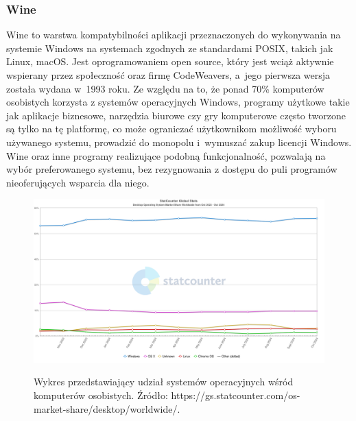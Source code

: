 \subsubsection{Wine\cite{wine}}
Wine to warstwa kompatybilności aplikacji przeznaczonych do wykonywania na systemie Windows na systemach zgodnych ze standardami POSIX, takich jak Linux, macOS. Jest oprogramowaniem open source, który jest wciąż aktywnie wspierany przez społeczność oraz firmę CodeWeavers, a~jego pierwsza wersja została wydana w~1993 roku. Ze względu na to, że ponad 70\% komputerów osobistych korzysta z systemów operacyjnych Windows\cite{windowsMarketShare}, programy użytkowe takie jak aplikacje biznesowe, narzędzia biurowe czy gry komputerowe często tworzone są tylko na tę platformę, co może ograniczać użytkownikom możliwość wyboru używanego systemu, prowadzić do monopolu i~wymuszać zakup licencji Windows. Wine oraz inne programy realizujące podobną funkcjonalność, pozwalają na wybór preferowanego systemu, bez rezygnowania z dostępu do puli programów nieoferujących wsparcia dla niego.

\begin{figure}[!h]
	\begin{center}
		\resizebox{1\textwidth}{!} {
			\includegraphics{img/3/desktop-os-market-share.png}
		}
		\caption{Wykres przedstawiający udział systemów operacyjnych wśród komputerów osobistych. Źródło: https://gs.statcounter.com/os-market-share/desktop/worldwide/.}
		\label{desktop-os-market-share}
	\end{center}
\end{figure}

